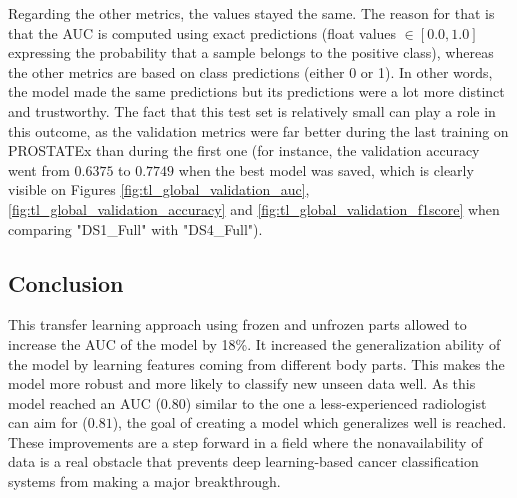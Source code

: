 Regarding the other metrics, the values stayed the same. The reason for that is that the AUC is computed using exact predictions (float values $\in [0.0,1.0]$ expressing the probability that a sample belongs to the positive class), whereas the other metrics are based on class predictions (either 0 or 1). In other words, the model made the same predictions but its predictions were a lot more distinct and trustworthy. The fact that this test set is relatively small can play a role in this outcome, as the validation metrics were far better during the last training on PROSTATEx than during the first one (for instance, the validation accuracy went from $0.6375$ to $0.7749$ when the best model was saved, which is clearly visible on Figures \ref{fig:tl_global_validation_auc}, \ref{fig:tl_global_validation_accuracy} and \ref{fig:tl_global_validation_f1score} when comparing "DS1{\_}Full" with "DS4{\_}Full"). 



\subsection{Conclusion}
\setlength{\marginparwidth}{3cm}\leavevmode {}This transfer learning approach using frozen and unfrozen parts allowed to increase the AUC of the model by 18\%. It increased the generalization ability of the model by learning features coming from different body parts. This makes the model more robust and more likely to classify new unseen data well. As this model reached an AUC ($0.80$) similar to the one a less-experienced radiologist can aim for ($0.81$), the goal of creating a model which generalizes well is reached. These improvements are a step forward in a field where the nonavailability of data is a real obstacle that prevents deep learning-based cancer classification systems from making a major breakthrough. 

